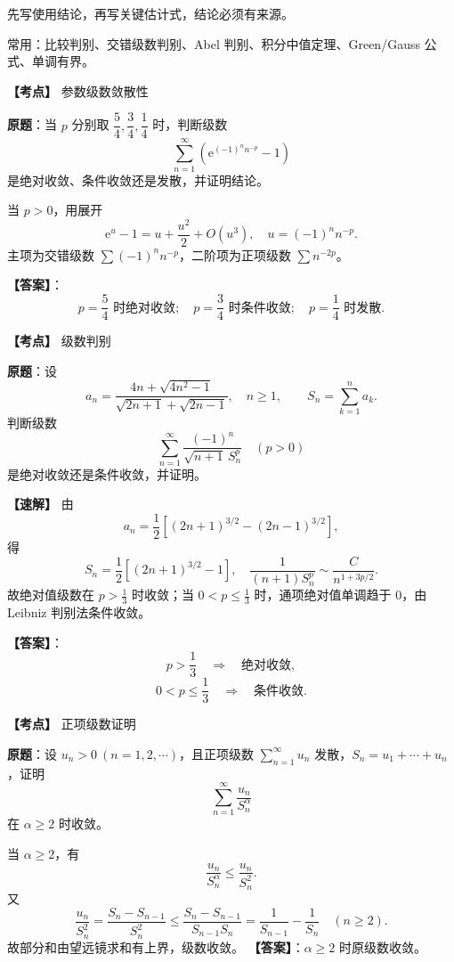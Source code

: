 ﻿\documentclass[11pt,a4paper,UTF8]{ctexart}
\newcommand{\ee}{\mathrm e}
\begin{document}
\begin{templatebox}[证明题写法]
先写使用结论，再写关键估计式，结论必须有来源。

常用：比较判别、交错级数判别、Abel 判别、积分中值定理、Green/Gauss 公式、单调有界。
\end{templatebox}

\begin{answerbox}[2022--2023 五-15]
\textbf{【考点】} 参数级数敛散性

\textbf{原题}：当 $p$ 分别取 $\dfrac54,\dfrac34,\dfrac14$ 时，判断级数
\[
\sum_{n=1}^{\infty}\left(\ee^{(-1)^n n^{-p}}-1\right)
\]
是绝对收敛、条件收敛还是发散，并证明结论。

当 $p>0$，用展开
\[
\ee^u-1=u+\frac{u^2}{2}+O(u^3),
\quad u=(-1)^n n^{-p}.
\]
主项为交错级数 $\sum(-1)^n n^{-p}$，二阶项为正项级数 $\sum n^{-2p}$。

\textbf{【答案】}：
\[
p=\frac54\text{ 时绝对收敛};
\quad p=\frac34\text{ 时条件收敛};
\quad p=\frac14\text{ 时发散}.
\]
\end{answerbox}

\begin{answerbox}[2023--2024 四-1]
\textbf{【考点】} 级数判别

\textbf{原题}：设
\[
a_n=\frac{4n+\sqrt{4n^2-1}}{\sqrt{2n+1}+\sqrt{2n-1}},
\quad n\ge1,\qquad
S_n=\sum_{k=1}^n a_k.
\]
判断级数
\[
\sum_{n=1}^{\infty}\frac{(-1)^n}{\sqrt{n+1}\,S_n^p}\quad(p>0)
\]
是绝对收敛还是条件收敛，并证明。

\textbf{【速解】} 由
\[
a_n=\frac12\left[(2n+1)^{3/2}-(2n-1)^{3/2}\right],
\]
得
\[
S_n=\frac12\left[(2n+1)^{3/2}-1\right],
\quad
\frac1{(n+1)S_n^p}\sim \frac{C}{n^{1+3p/2}}.
\]
故绝对值级数在 $p>\frac13$ 时收敛；当 $0<p\le\frac13$ 时，通项绝对值单调趋于 $0$，由 Leibniz 判别法条件收敛。

\textbf{【答案】}：
\[
p>\frac13\quad\Rightarrow\quad\text{绝对收敛},
\]
\[
0<p\le\frac13\quad\Rightarrow\quad\text{条件收敛}.
\]
\end{answerbox}

\begin{answerbox}[2024--2025 十]
\textbf{【考点】} 正项级数证明

\textbf{原题}：设 $u_n>0\ (n=1,2,\cdots)$，且正项级数 $\displaystyle\sum_{n=1}^{\infty}u_n$ 发散，$S_n=u_1+\cdots+u_n$，证明
\[
\sum_{n=1}^{\infty}\frac{u_n}{S_n^\alpha}
\]
在 $\alpha\ge2$ 时收敛。

当 $\alpha\ge2$，有
\[
\frac{u_n}{S_n^\alpha}\le\frac{u_n}{S_n^2}.
\]
又
\[
\frac{u_n}{S_n^2}
=\frac{S_n-S_{n-1}}{S_n^2}
\le \frac{S_n-S_{n-1}}{S_{n-1}S_n}
=\frac1{S_{n-1}}-\frac1{S_n}
\quad(n\ge2).
\]
故部分和由望远镜求和有上界，级数收敛。
\textbf{【答案】}：$\alpha\ge2$ 时原级数收敛。
\end{answerbox}
\end{document}
